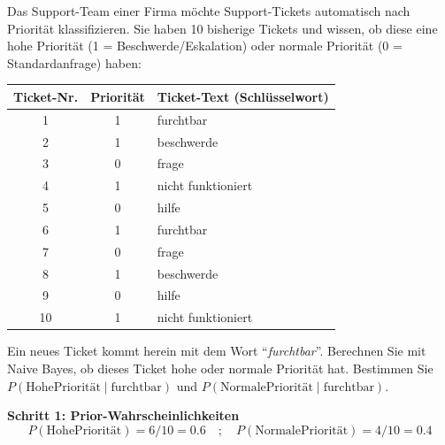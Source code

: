 \begin{myexercise}
    \label{ex:ticket-prioritization}
    Das Support-Team einer Firma möchte Support-Tickets automatisch nach Priorität klassifizieren. Sie haben 10 bisherige Tickets und wissen, ob diese eine hohe Priorität (1 = Beschwerde/Eskalation) oder normale Priorität (0 = Standardanfrage) haben:

    \begin{table}[H]
        \centering
        \begin{tabular}{c|c|l}
            \textbf{Ticket-Nr.} & \textbf{Priorität} & \textbf{Ticket-Text (Schlüsselwort)} \\
            \midrule
            1                   & 1                  & furchtbar                            \\
            2                   & 1                  & beschwerde                           \\
            3                   & 0                  & frage                                \\
            4                   & 1                  & nicht funktioniert                   \\
            5                   & 0                  & hilfe                                \\
            6                   & 1                  & furchtbar                            \\
            7                   & 0                  & frage                                \\
            8                   & 1                  & beschwerde                           \\
            9                   & 0                  & hilfe                                \\
            10                  & 1                  & nicht funktioniert                   \\
        \end{tabular}
    \end{table}

    Ein neues Ticket kommt herein mit dem Wort \enquote{\textit{furchtbar}}. Berechnen Sie mit Naive Bayes, ob dieses Ticket hohe oder normale Priorität hat. Bestimmen Sie $P(\text{HohePriorität}\mid\text{furchtbar})$ und $P(\text{NormalePriorität}\mid\text{furchtbar})$.

    \begin{myanswer}
        \textbf{Schritt 1: Prior-Wahrscheinlichkeiten}
        \[
            P(\text{HohePriorität}) = 6/10 = 0.6 \quad ; \quad P(\text{NormalePriorität}) = 4/10 = 0.4
        \]


\end{myanswer}
\end{myexercise}
